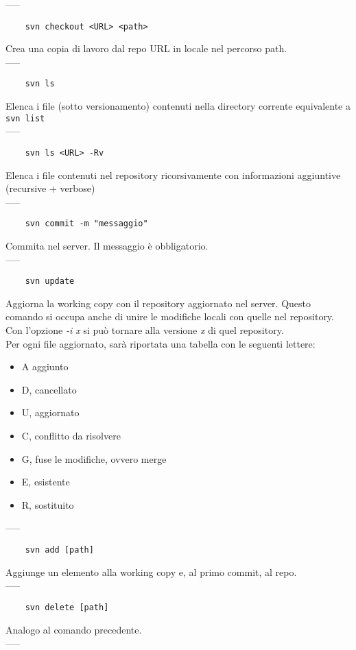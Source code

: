 \documentclass[a4paper]{article}
\begin{document}
	-----
	\begin{verbatim}
	svn checkout <URL> <path> 
	\end{verbatim}
	Crea una copia di lavoro dal repo URL in locale nel percorso path.\\-----
	\begin{verbatim}
	svn ls
	\end{verbatim}
	Elenca i file (sotto versionamento) contenuti nella directory corrente equivalente a \verb|svn list|\\-----
	\begin{verbatim}
	svn ls <URL> -Rv
	\end{verbatim}
	Elenca i file contenuti nel repository ricorsivamente con informazioni aggiuntive (recursive + verbose)\\-----
	\begin{verbatim}
	svn commit -m "messaggio"
	\end{verbatim}
	Commita nel server. Il messaggio è obbligatorio.\\-----
	\begin{verbatim}
	svn update
	\end{verbatim}
	Aggiorna la working copy con il repository aggiornato nel server. Questo comando si occupa anche di unire le modifiche locali con quelle nel repository.\\
	Con l'opzione \textit{-i x} si può tornare alla versione \textit{x} di quel repository.\\
	Per ogni file aggiornato, sarà riportata una tabella con le seguenti lettere:
	\begin{itemize}
		\item A aggiunto
		\item D, cancellato
		\item U, aggiornato
		\item C, conflitto da risolvere
		\item G, fuse le modifiche, ovvero merge
		\item E, esistente
		\item R, sostituito
	\end{itemize}
	-----
	\begin{verbatim}
	svn add [path]
	\end{verbatim}
	Aggiunge un elemento alla working copy e, al primo commit, al repo.\\-----
	\begin{verbatim}
	svn delete [path]
	\end{verbatim}
	Analogo al comando precedente.\\-----
\end{document}
